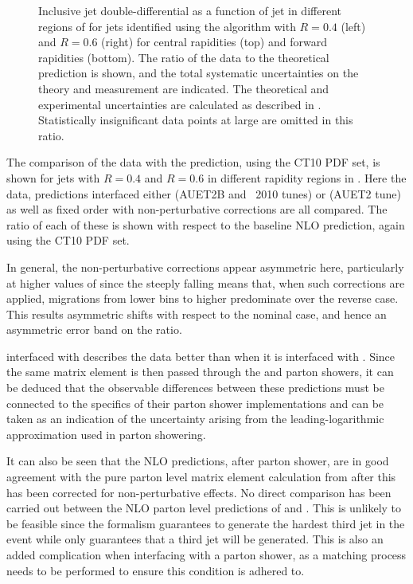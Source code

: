 \begin{figure}[htpb]
{    \label{fig:forward-inclusive:NLORatioForward_akt6}}
  \caption{Inclusive jet double-differential \xs as a function of jet
           \pT in different regions of \absRap for jets identified using the \akt
           algorithm with $R=0.4$ (left) and $R=0.6$ (right) for central rapidities (top)
           and forward rapidities (bottom). The ratio of the data
           to the theoretical prediction is shown, and the total systematic uncertainties
           on the theory and measurement are indicated. The theoretical and experimental
           uncertainties are calculated as described in .
           Statistically insignificant data points at large \pT are omitted in this
           ratio.}
  \label{fig:forward-inclusive:NLORatio}
\end{figure}

The comparison of the data with the \Powheg prediction, using the CT10 PDF set, is
shown for \akt jets with $R=0.4$ and $R=0.6$ in different rapidity regions in
. Here the data, \Powheg
predictions interfaced either \Pythia (AUET2B and \Perugia~2010 tunes) or \Herwig
(AUET2 tune) as well as fixed order \Powheg with non-perturbative corrections
are all compared. The ratio of each of these is shown with respect to the baseline NLO
\pQCD prediction, again using the CT10 PDF set.

In general, the non-perturbative corrections appear asymmetric here, particularly
at higher values of \pT since the steeply falling \xs means that, when such corrections
are applied, migrations from lower bins to higher predominate over the reverse case.
This results asymmetric shifts with respect to the nominal case, and hence an asymmetric
error band on the ratio.

\Powheg interfaced with \Pythia describes the data better than
when it is interfaced with \Herwig. Since the same matrix element is then passed through
the \Pythia and \Herwig parton showers, it can be deduced that the observable
differences between these predictions must be connected to the specifics of
their parton shower implementations and can be taken as an indication of the
uncertainty arising from the leading-logarithmic approximation used in parton
showering.

It can also be seen that the \Powheg NLO predictions, after parton shower, are in
good agreement with the pure parton level matrix element calculation from \NLOjetpp
after this has been corrected for non-perturbative effects. No direct comparison
has been carried out between the NLO parton level predictions of \Powheg and \NLOjetpp.
This is unlikely to be feasible since the \Powheg formalism guarantees to generate
the hardest third jet in the event while \NLOjetpp only guarantees that a third jet
will be generated. This is also an added complication when interfacing \Powheg with
a parton shower, as a matching process needs to be performed to ensure this condition
is adhered to.

